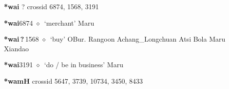 \item
\textbf{*wai}
?
  {\tiny crossid 6874, 1568, 3191}
  \begin{list}{}{\leftmargin=1.5em \itemindent=-1.5em}
  \item {\footnotesize \textbf{*wai}}{\tiny 6874}
         $\diamond$~`merchant'
         Maru 
  \item {\footnotesize \textbf{*wai\,?\,}}{\tiny 1568}
\hspace{1ex}
         $\diamond$~`buy'
         OBur. 
\hspace{1ex}
         Rangoon 
\hspace{1ex}
         Achang\_Longchuan 
\hspace{1ex}
         Atsi 
\hspace{1ex}
         Bola 
\hspace{1ex}
         Maru 
\hspace{1ex}
         Xiandao 
  \item {\footnotesize \textbf{*wai}}{\tiny 3191}
\hspace{1ex}
         $\diamond$~`do / be in business'
         Maru 
  \end{list}
\item
\textbf{*wamH}
  {\tiny crossid 5647, 3739, 10734, 3450, 8433}
